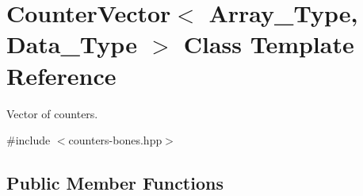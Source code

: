 \hypertarget{class_counter_vector}{}\section{Counter\+Vector$<$ Array\+\_\+\+Type, Data\+\_\+\+Type $>$ Class Template Reference}
\label{class_counter_vector}


Vector of counters.  




{\ttfamily \#include $<$counters-\/bones.\+hpp$>$}

\subsection*{Public Member Functions}
